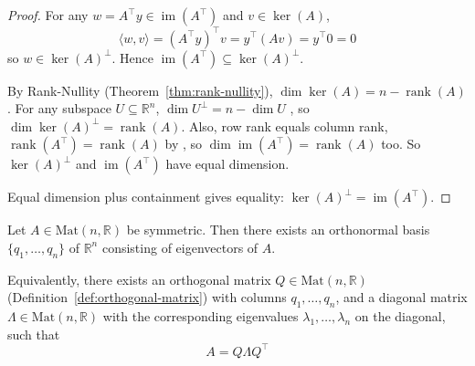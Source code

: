 		\begin{proof}
			For any $w=A^\top y\in\operatorname{im}(A^\top)$ and $v\in\ker(A)$,
			\[
				\langle w,v\rangle = (A^\top y)^\top v = y^\top(Av) = y^\top 0 = 0
			\]
			so $w\in\ker(A)^\perp$. Hence $\operatorname{im}(A^\top)\subseteq\ker(A)^\perp$.
			
			By Rank-Nullity (Theorem~\ref{thm:rank-nullity}), $\dim\ker(A)=n-\operatorname{rank}(A)$. For any subspace $U\subseteq\mathbb{R}^n$, $\dim U^\perp = n-\dim U$ \citep{HornJohnson2013}, so $\dim\ker(A)^\perp = \operatorname{rank}(A)$. Also, row rank equals column rank, $\operatorname{rank}(A^\top) = \operatorname{rank}(A)$ by \cite{HornJohnson2013}, so $\dim\operatorname{im}(A^\top)=\operatorname{rank}(A)$ too. So $\ker(A)^\perp$ and $\operatorname{im}(A^\top)$ have equal dimension.
			
			Equal dimension plus containment gives equality: $\ker(A)^\perp = \operatorname{im}(A^\top)$.
		\end{proof}
		
		\begin{theorem}
			\label{thm:spectral-theorem}
			Let $A \in \mathrm{Mat}(n,\mathbb{R})$ be symmetric. Then there exists an orthonormal basis $\{q_1,\dots,q_n\}$ of $\mathbb{R}^n$ consisting of eigenvectors of $A$.
			
			Equivalently, there exists an orthogonal matrix $Q \in \mathrm{Mat}(n,\mathbb{R})$ (Definition~\ref{def:orthogonal-matrix}) with columns $q_1,\dots,q_n$, and a diagonal matrix $\Lambda \in \mathrm{Mat}(n,\mathbb{R})$ with the corresponding eigenvalues $\lambda_1,\dots,\lambda_n$ on the diagonal, such that
			\[
				A = Q\Lambda Q^\top
			\]
		\end{theorem}
		
